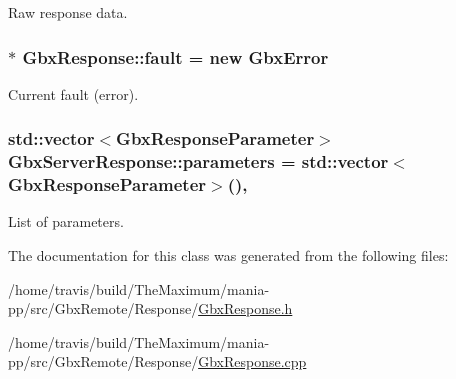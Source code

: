 Raw response data. 

\hypertarget{classGbxResponse_ad896e7447681008320ad9945b57a92ad}{
\subsubsection[{fault}]{$\ast$ Gbx\-Response\-::fault = new {\bf Gbx\-Error}\hspace{0.3cm}{\ttfamily [private]}}}\label{classGbxResponse_ad896e7447681008320ad9945b57a92ad}


Current fault (error). 

\hypertarget{classGbxServerResponse_acfd80e7b92cf34e1f0cda88a11a1bed0}{
\subsubsection[{parameters}]{\setlength{\rightskip}{0pt plus 5cm}std\-::vector$<${\bf Gbx\-Response\-Parameter}$>$ Gbx\-Server\-Response\-::parameters = std\-::vector$<${\bf Gbx\-Response\-Parameter}$>$()\hspace{0.3cm}{\ttfamily [protected]}, {\ttfamily [inherited]}}}\label{classGbxServerResponse_acfd80e7b92cf34e1f0cda88a11a1bed0}


List of parameters. 



The documentation for this class was generated from the following files\-:\begin{DoxyCompactItemize}
\item 
/home/travis/build/\-The\-Maximum/mania-\/pp/src/\-Gbx\-Remote/\-Response/\hyperlink{GbxResponse_8h}{Gbx\-Response.\-h}\item 
/home/travis/build/\-The\-Maximum/mania-\/pp/src/\-Gbx\-Remote/\-Response/\hyperlink{GbxResponse_8cpp}{Gbx\-Response.\-cpp}\end{DoxyCompactItemize}
